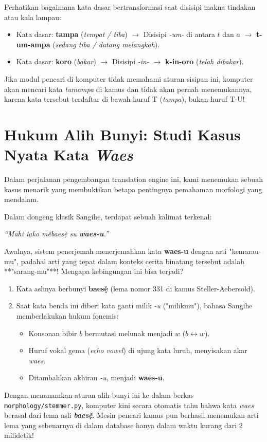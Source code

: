 \begin{linguisticbox}
Perhatikan bagaimana kata dasar bertransformasi saat disisipi makna tindakan atau kala lampau:
\begin{itemize}
    \item Kata dasar: \textbf{tampa} (\textit{tempat / tiba}) $\rightarrow$ Disisipi \textit{-um-} di antara $t$ dan $a$ $\rightarrow$ \textbf{t-um-ampa} (\textit{sedang tiba / datang melangkah}).
    \item Kata dasar: \textbf{koro} (\textit{bakar}) $\rightarrow$ Disisipi \textit{-in-} $\rightarrow$ \textbf{k-in-oro} (\textit{telah dibakar}).
\end{itemize}
Jika modul pencari di komputer tidak memahami aturan sisipan ini, komputer akan mencari kata \textit{tumampa} di kamus dan tidak akan pernah menemukannya, karena kata tersebut terdaftar di bawah huruf T (\textit{tampa}), bukan huruf T-U!
\end{linguisticbox}

\section{Hukum Alih Bunyi: Studi Kasus Nyata Kata \textit{Waes}}
Dalam perjalanan pengembangan translation engine ini, kami menemukan sebuah kasus menarik yang membuktikan betapa pentingnya pemahaman morfologi yang mendalam.

Dalam dongeng klasik Sangihe, terdapat sebuah kalimat terkenal:
\begin{center}
\textit{“Mahi i\d{a}ko m\v{e}baes\v{\d{e}} su \textbf{waes-u}.”}
\end{center}
Awalnya, sistem penerjemah menerjemahkan kata \textbf{waes-u} dengan arti "kemarau-mu", padahal arti yang tepat dalam konteks cerita binatang tersebut adalah **"sarang-mu"**! Mengapa kebingungan ini bisa terjadi?

\begin{enumerate}
    \item Kata aslinya berbunyi \textbf{baes\v{\d{e}}} (lema nomor 331 di kamus Steller-Aebersold).
    \item Saat kata benda ini diberi kata ganti milik \textit{-u} ("milikmu"), bahasa Sangihe memberlakukan hukum fonemis:
    \begin{itemize}
        \item Konsonan bibir $b$ bermutasi melunak menjadi $w$ ($b \leftrightarrow w$).
        \item Huruf vokal gema (\textit{echo vowel}) di ujung kata luruh, menyisakan akar \textit{waes}.
        \item Ditambahkan akhiran \textit{-u}, menjadi \textbf{waes-u}.
    \end{itemize}
\end{enumerate}

Dengan menanamkan aturan alih bunyi ini ke dalam berkas \texttt{morphology/stemmer.py}, komputer kini secara otomatis tahu bahwa kata \textit{waes} berasal dari lema asli \textbf{\textit{baes\v{\d{e}}}}. Mesin pencari kamus pun berhasil menemukan arti lema yang sebenarnya di dalam database hanya dalam waktu kurang dari 2 milidetik!
